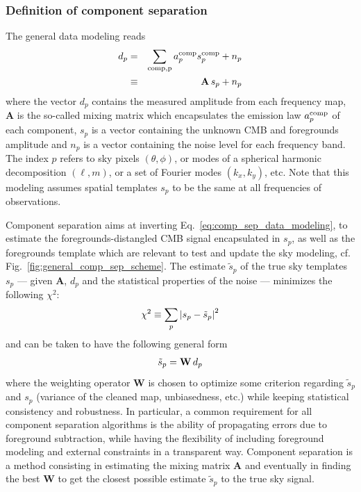 \subsubsection{Definition of component separation}
The general data modeling reads
\begin{eqnarray}
	\centering	
		d_p &=& \sum_{\rm comp, p} a_p^{\rm comp} s^{\rm comp}_p + n_p\\
		 &\equiv& \mathbf{A}\,s_p + n_p
	\label{eq:comp_sep_data_modeling}
\end{eqnarray}
where the vector $d_p$ contains the measured amplitude from each frequency map, $\mathbf{A}$ is the so-called mixing matrix which encapsulates the emission law $a_p^{\rm comp}$ of each component, $s_p$ is a vector containing the unknown CMB and foregrounds amplitude and $n_p$ is a vector containing the noise level for each frequency band. The index $p$ refers to sky pixels $\left( \theta, \phi \right)$, or modes of a spherical harmonic decomposition $\left( \ell, m\right)$, or a set of Fourier modes $\left(k_x,k_y\right)$, etc. Note that this modeling assumes spatial templates $s_p$ to be the same at all frequencies of observations.

Component separation aims at inverting Eq.~\ref{eq:comp_sep_data_modeling}, to estimate the foregrounds-distangled CMB signal encapsulated in $s_p$, as well as the foregrounds template which are relevant to test and update the sky modeling, cf. Fig.~\ref{fig:general_comp_sep_scheme}.
The estimate $\tilde{s}_p$ of the true sky templates $s_p$ --- given $\mathbf{A}$, $d_p$ and the statistical properties of the noise --- minimizes the following $\chi^2$:
\begin{eqnarray}
	\centering
		\chi^2 \equiv \sum_p \left| s_p - \tilde{s}_p\right|^2
	\label{eq:chi2_compsep}
\end{eqnarray}
and can be taken to have the following general form
\begin{eqnarray}
	\centering
		\tilde{s}_p = \mathbf{W}\,d_p
	\label{eq:sp_solution}
\end{eqnarray}
where the weighting operator $\mathbf{W}$ is chosen to optimize some criterion regarding $\tilde{s}_p$ and $s_p$ (variance of the cleaned map, unbiasedness, etc.) while keeping statistical consistency and robustness. In particular, a common requirement for all component separation algorithms is the ability of propagating errors due to foreground subtraction, while having the flexibility of including foreground modeling and external constraints in a transparent way. 
Component separation is a method consisting in estimating the mixing matrix $\mathbf{A}$ and eventually in finding the best $\mathbf{W}$ to get the closest possible estimate $\tilde{s}_p$ to the true sky signal.

